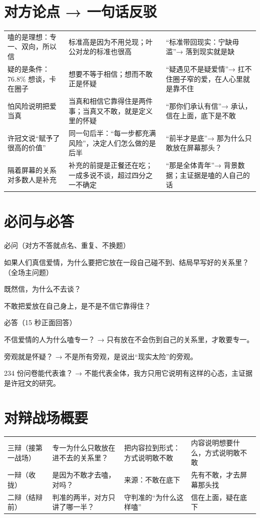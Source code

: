 \documentclass[quick,con]{debate}
\begin{document}
\section{对方论点 → 一句话反驳}
\begin{tabularx}{\linewidth}{@{}Y Y Y@{}}\toprule
{}&&\\\midrule
嗑的是理想：专一、双向，所以信&标准高是因为不用兑现；叶公对龙的标准也很高&“标准带回现实：宁缺毋滥”→ 落到现实就是缺\\
疑的是条件：76.8\% 想谈，卡在圈子&想要不等于相信；想而不敢正是怀疑&“疑遇见不是疑爱情”→ 扛不住圈子窄的爱，在人心里就是靠不住\\
怕风险说明把爱当真&当真和相信它靠得住是两件事；当真又不敢，就是定义里的怀疑&“那你们承认有信”→ 承认，信在上面，底下是不敢\\
许冠文说“赋予了很高的价值”&同一句后半：“每一步都充满风险”，决定人们怎么做的是后半&“前半才是底”→ 那为什么只敢放在屏幕那头？\\
隔着屏幕的关系对多数人是补充&补充的前提是正餐还在吃；一成多说不谈，超过四分之一不确定&“那是全体青年”→ 背景数据；主证据是嗑的人自己的话\\
\bottomrule\end{tabularx}

\section{必问与必答}
\begin{points}{必问（对方不答就点名、重复、不换题）}
\item 如果人们真信爱情，为什么要把它放在一段自己碰不到、结局早写好的关系里？（全场主问题）
\item 既然信，为什么不去谈？
\item 不敢把爱放在自己身上，是不是不信它靠得住？
\end{points}
\begin{points}{必答（15 秒正面回答）}
\item 不信爱情的人为什么嗑专一？ → 只有放在不会伤到自己的关系里，才敢要专一。
\item 旁观就是怀疑？ → 不是所有旁观，是说出“现实太险”的旁观。
\item 234 份问卷能代表谁？ → 不能代表全体，我方只用它说明有这样的心态，主证据是许冠文的研究。
\end{points}

\section{对辩战场概要}
\begin{tabularx}{\linewidth}{@{}L{5.2em}Y Y Y@{}}\toprule
{}&&&\\\midrule
三辩（接第一战场）&专一为什么只敢放在进不去的关系里？&把内容拉到形式：方式说明敢不敢&内容说明想要什么，方式说明敢不敢\\
一辩（收拢）&是因为不敢才去嗑，对吗？&来源：不敢在底下&先有不敢，才去屏幕那头找\\
二辩（结辩前）&判准的两半，对方只讲了哪一半？&守判准的“为什么这样嗑”&信在上面，疑在底下\\
\bottomrule\end{tabularx}
\end{document}
